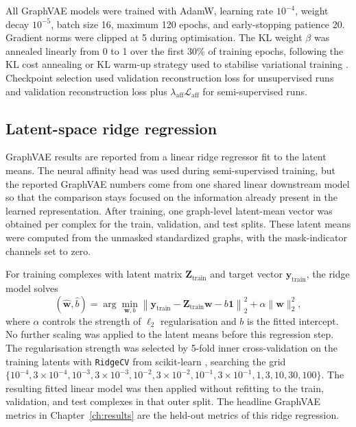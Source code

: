 All GraphVAE models were trained with AdamW, learning rate $10^{-4}$, weight decay $10^{-5}$, batch size 16, maximum 120 epochs, and early-stopping patience 20. Gradient norms were clipped at 5 during optimisation. The KL weight $\beta$ was annealed linearly from 0 to 1 over the first 30\% of training epochs, following the KL cost annealing or KL warm-up strategy used to stabilise variational training \citep{Bowman2016ContinuousSpace,Sonderby2016LVAE}. Checkpoint selection used validation reconstruction loss for unsupervised runs and validation reconstruction loss plus $\lambda_{\mathrm{aff}}\mathcal{L}_{\mathrm{aff}}$ for semi-supervised runs.

\subsection{Latent-space ridge regression}

GraphVAE results are reported from a linear ridge regressor fit to the latent means. The neural affinity head was used during semi-supervised training, but the reported GraphVAE numbers come from one shared linear downstream model so that the comparison stays focused on the information already present in the learned representation. After training, one graph-level latent-mean vector was obtained per complex for the train, validation, and test splits. These latent means were computed from the unmasked standardized graphs, with the mask-indicator channels set to zero.

For training complexes with latent matrix $\mathbf{Z}_{\mathrm{train}}$ and target vector $\mathbf{y}_{\mathrm{train}}$, the ridge model solves
\begin{equation}
(\hat{\mathbf{w}}, \hat{b})
=
\arg\min_{\mathbf{w}, b}
\left\|
\mathbf{y}_{\mathrm{train}} - \mathbf{Z}_{\mathrm{train}}\mathbf{w} - b\mathbf{1}
\right\|_2^2
+
\alpha \|\mathbf{w}\|_2^2,
\end{equation}
where $\alpha$ controls the strength of $\ell_2$ regularisation and $b$ is the fitted intercept. No further scaling was applied to the latent means before this regression step. The regularisation strength was selected by 5-fold inner cross-validation on the training latents with \texttt{RidgeCV} from scikit-learn \citep{Pedregosa2011Scikit}, searching the grid $\{10^{-4}, 3\times10^{-4}, 10^{-3}, 3\times10^{-3}, 10^{-2}, 3\times10^{-2}, 10^{-1}, 3\times10^{-1}, 1, 3, 10, 30, 100\}$. The resulting fitted linear model was then applied without refitting to the train, validation, and test complexes in that outer split. The headline GraphVAE metrics in Chapter~\ref{ch:results} are the held-out metrics of this ridge regression.

